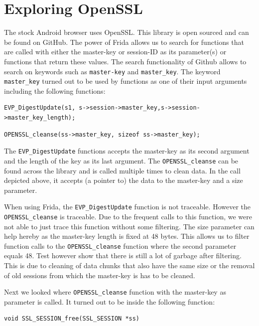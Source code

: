 \documentclass[12pt, a4paper]{report}
\begin{document}
\section{Exploring OpenSSL}
The stock Android browser uses OpenSSL. This library is open sourced and can be found on GitHub\cite{git}. The power of Frida allows us to search for functions that are called with either the master-key or session-ID as its parameter(s) or functions that return these values. The search functionality of Github allows to search on keywords such as \texttt{master-key} and \texttt{master\_key}. The keyword \texttt{master\_key} turned out to be used by functions as one of their input arguments including the following functions:

\begin{lstlisting}[frame=single, breaklines=true]
EVP_DigestUpdate(s1, s->session->master_key,s->session->master_key_length);
\end{lstlisting}

\begin{lstlisting}[frame=single, breaklines=true]
OPENSSL_cleanse(ss->master_key, sizeof ss->master_key);
\end{lstlisting}

\noindent The \texttt{EVP\_DigestUpdate} functions accepts the master-key as its second argument and the length of the key as its last argument. The \texttt{OPENSSL\_cleanse} can be found across the library and is called multiple times to clean data. In the call depicted above, it accepts (a pointer to) the data to the master-key and a size parameter. 

When using Frida, the \texttt{EVP\_DigestUpdate} function is not traceable. However the \texttt{OPENSSL\_cleanse} is traceable. Due to the frequent calls to this function, we were not able to just trace this function without some filtering. The size parameter can help hereby as the master-key length is fixed at 48 bytes. This allows us to filter function calls to the \texttt{OPENSSL\_cleanse} function where the second parameter equals 48. Test however show that there is still a lot of garbage after filtering. This is due to cleaning of data chunks that also have the same size or the removal of old sessions from which the master-key is has to be cleaned. 


\noindent Next we looked where \texttt{OPENSSL\_cleanse} function with the master-key as parameter is called. It turned out to be inside the following function:

\begin{lstlisting}[frame=single, breaklines=true]
void SSL_SESSION_free(SSL_SESSION *ss)
\end{lstlisting}
\end{document}
